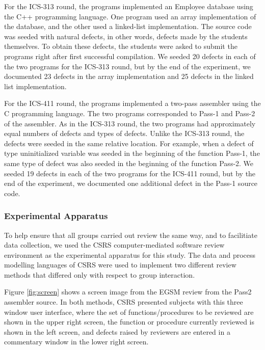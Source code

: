 For the ICS-313 round, the programs implemented an Employee database using
the C++ programming language. One program used an array implementation of
the database, and the other used a linked-list implementation.  The source
code was seeded with natural defects, in other words, defects made by the students
themselves. To obtain these defects, the students were asked to submit the
programs right after first successful compilation.  We seeded 20 defects in
each of the two programs for the ICS-313 round, but by the end of the
experiment, we documented 23 defects in the array implementation and 25
defects in the linked list implementation.

For the ICS-411 round, the programs implemented a two-pass assembler using
the C programming language. The two programs corresponded to Pass-1 and
Pass-2 of the assembler. As in the ICS-313 round, the two
programs had approximately equal numbers of defects and types of defects.
Unlike the ICS-313 round, the defects were seeded in the same relative
location.  For example, when a defect of type uninitialized variable was
seeded in the beginning of the function Pass-1, the same type of defect was
also seeded in the beginning of the function Pass-2.  We seeded 19 defects
in each of the two programs for the ICS-411 round, but by the end of the
experiment, we documented one additional defect in the Pass-1 source code.



\subsubsection{Experimental Apparatus}

To help ensure that all groups carried out review the same way, and to 
facilitiate data collection, we used the CSRS computer-mediated software
review environment as the experimental apparatus for this study.  The
data and process modelling languages of CSRS were used to implement two
different review methods that differed only with respect to group interaction.

Figure \ref{fig:screen} shows a screen image from the EGSM review from the
Pass2 assembler source.  In both methods, CSRS presented subjects with this
three window user interface, where the set of functions/procedures to be
reviewed are shown in the upper right screen, the function or procedure
currently reviewed is shown in the left screen, and defects raised by
reviewers are entered in a commentary window in the lower right screen.


